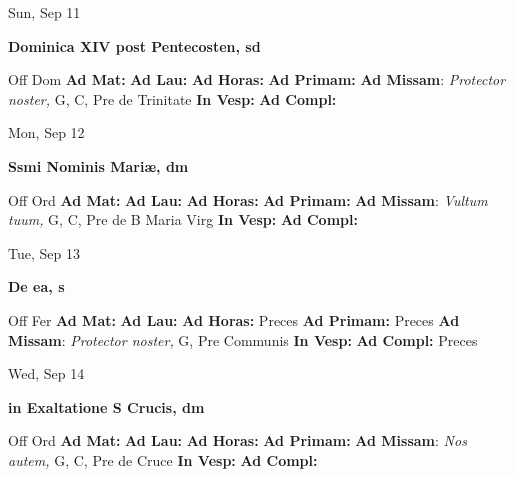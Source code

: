 \documentclass[10pt]{article}
\begin{document}
\begin{minipage}{3.5in}
\vspace{2em}\begin{center}
Sun, Sep 11
\end{center}\textbf{ \large Dominica XIV post Pentecosten, \textnormal{\normalsize sd}}
\begin{justify}
Off Dom
\textbf{Ad Mat: }
\textbf{Ad Lau: }
\textbf{Ad Horas: }
\textbf{Ad Primam: }
\textbf{Ad Missam}: \textit{Protector noster,} G, C, Pre de Trinitate
\textbf{In Vesp: }
\textbf{Ad Compl: }\end{justify}
\end{minipage}



\begin{minipage}{3.5in}
\vspace{2em}\begin{center}
Mon, Sep 12
\end{center}\textbf{ \large Ssmi Nominis Mariæ, \textnormal{\normalsize dm}}
\begin{justify}
Off Ord
\textbf{Ad Mat: }
\textbf{Ad Lau: }
\textbf{Ad Horas: }
\textbf{Ad Primam: }
\textbf{Ad Missam}: \textit{Vultum tuum,} G, C, Pre de B Maria Virg
\textbf{In Vesp: }
\textbf{Ad Compl: }\end{justify}
\end{minipage}



\begin{minipage}{3.5in}
\vspace{2em}\begin{center}
Tue, Sep 13
\end{center}\textbf{ \large De ea, \textnormal{\normalsize s}}
\begin{justify}
Off Fer
\textbf{Ad Mat: }
\textbf{Ad Lau: }
\textbf{Ad Horas: }Preces
\textbf{Ad Primam: }Preces
\textbf{Ad Missam}: \textit{Protector noster,} G, Pre Communis
\textbf{In Vesp: }
\textbf{Ad Compl: }Preces\end{justify}
\end{minipage}



\begin{minipage}{3.5in}
\vspace{2em}\begin{center}
Wed, Sep 14
\end{center}\textbf{ \large in Exaltatione S Crucis, \textnormal{\normalsize dm}}
\begin{justify}
Off Ord
\textbf{Ad Mat: }
\textbf{Ad Lau: }
\textbf{Ad Horas: }
\textbf{Ad Primam: }
\textbf{Ad Missam}: \textit{Nos autem,} G, C, Pre de Cruce
\textbf{In Vesp: }
\textbf{Ad Compl: }\end{justify}
\end{minipage}
\end{document}
